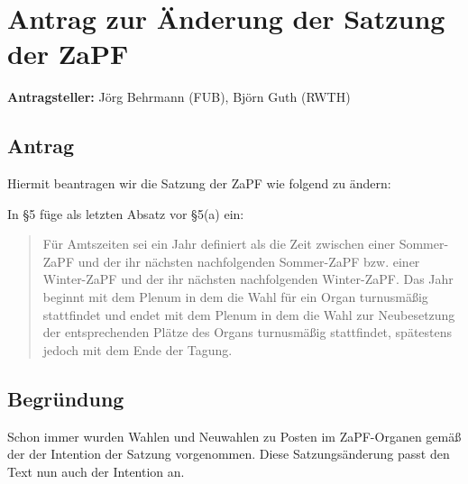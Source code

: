 \documentclass[draft,10pt,oneside]{scrartcl}
\begin{document}
\section*{Antrag zur Änderung der Satzung der ZaPF}

\textbf{Antragsteller:} Jörg Behrmann (FUB), Björn Guth (RWTH)

\subsection*{Antrag}

Hiermit beantragen wir die Satzung der ZaPF wie folgend zu
ändern:

In §5 füge als letzten Absatz vor §5(a) ein:
\begin{quote}
    Für Amtszeiten sei ein Jahr definiert als die Zeit zwischen einer
    Sommer-ZaPF und der ihr nächsten nachfolgenden Sommer-ZaPF bzw. einer
    Winter-ZaPF und der ihr nächsten nachfolgenden Winter-ZaPF. Das Jahr
    beginnt mit dem Plenum in dem die Wahl für ein Organ turnusmäßig
    stattfindet und endet mit dem Plenum in dem die Wahl zur Neubesetzung der
    entsprechenden Plätze des Organs turnusmäßig stattfindet, spätestens jedoch
    mit dem Ende der Tagung.

\end{quote}

\subsection*{Begründung}
Schon immer wurden Wahlen und Neuwahlen zu Posten im ZaPF-Organen gemäß der der
Intention der Satzung vorgenommen. Diese Satzungsänderung passt den Text nun
auch der Intention an.
\end{document}
